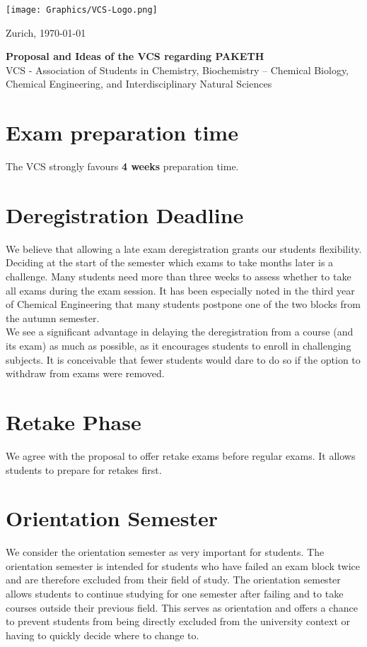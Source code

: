 \documentclass{article}
\begin{document}
\vspace{-4cm}
\texttt{[image: Graphics/VCS-Logo.png]}

\vspace{-1.5cm}
\begin{flushright}
\parbox[r]{4cm}{Zurich, \today}
\end{flushright}

\vspace{1.5cm} %
\begin{center}
\textbf{\LARGE{Proposal and Ideas of the VCS regarding PAKETH}} \\
\vspace{0.5cm}
\Large
VCS - Association of Students in Chemistry, Biochemistry – Chemical Biology, 
Chemical Engineering, and Interdisciplinary Natural Sciences
\end{center}

\section{Exam preparation time}
The VCS strongly favours \textbf{4 weeks} preparation time.

\section{Deregistration Deadline}
We believe that allowing a late exam deregistration grants our students flexibility. Deciding at the start of the semester which exams to take months later is a challenge. Many students need more than three weeks to assess whether to take all exams during the exam session. It has been especially noted in the third year of Chemical Engineering that many students postpone one of the two blocks from the autumn semester. \\

We see a significant advantage in delaying the deregistration from a course (and its exam) as much as possible, as it encourages students to enroll in challenging subjects. It is conceivable that fewer students would dare to do so if the option to withdraw from exams were removed.

\section{Retake Phase}
We agree with the proposal to offer retake exams before regular exams. It allows students to prepare for retakes first.

\section{Orientation Semester}
We consider the orientation semester as very important for students. The orientation semester is intended for students who have failed an exam block twice and are therefore excluded from their field of study. The orientation semester allows students to continue studying for one semester after failing and to take courses outside their previous field. This serves as orientation and offers a chance to prevent students from being directly excluded from the university context or having to quickly decide where to change to.\\
\end{document}
